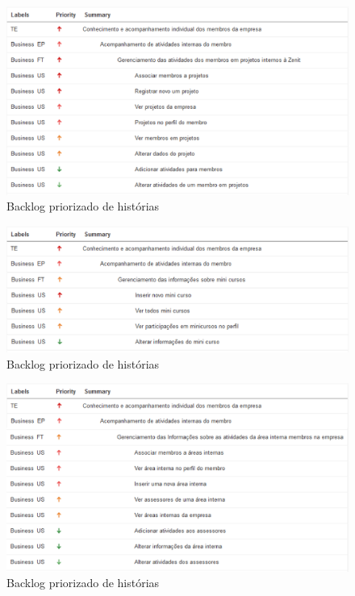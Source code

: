 \begin{figure}[H]
    \centering
    \includegraphics[keepaspectratio=true,scale=0.6]{figuras/blus05.eps}
    \caption[Backlog história]{Backlog priorizado de histórias\label{backlogus05}}
\end{figure}

\begin{figure}[H]
    \centering
    \includegraphics[keepaspectratio=true,scale=0.6]{figuras/blus06.eps}
    \caption[Backlog história]{Backlog priorizado de histórias\label{backlogus06}}
\end{figure}

\begin{figure}[H]
    \centering
    \includegraphics[keepaspectratio=true,scale=0.6]{figuras/blus07.eps}
    \caption[Backlog história]{Backlog priorizado de histórias\label{backlogus07}}
\end{figure}

